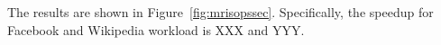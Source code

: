 The results are shown in Figure~\ref{fig:mrisopssec}.  Specifically,
the speedup for Facebook and Wikipedia workload is XXX and YYY. 

